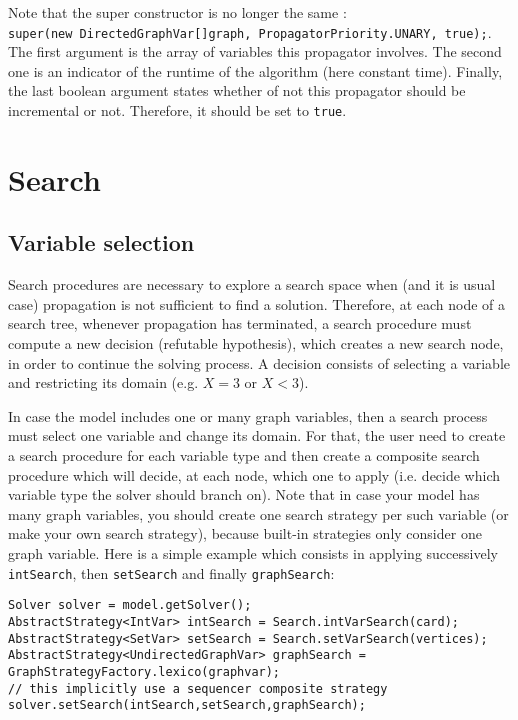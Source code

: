\documentclass{article}
\begin{document}
Note that the super constructor is no longer the same : \\
\texttt{super(new DirectedGraphVar[]{graph}, PropagatorPriority.UNARY, true);}. 
The first argument is the array of variables this propagator involves. The second one is an indicator of the runtime of the algorithm (here constant time). Finally, the last boolean argument states whether of not this propagator should be incremental or not. Therefore, it should be set to \texttt{true}.

\newpage{}
\section{Search}

\subsection{Variable selection}

Search procedures are necessary to explore a search space when (and it is usual case) propagation is not sufficient to find a solution. 
Therefore, at each node of a search tree, whenever propagation has terminated, a search procedure must compute a new decision (refutable hypothesis), which creates a new search node, in order to continue the solving process. A decision consists of selecting a variable and restricting its domain (e.g. $X=3$ or $X<3$). 

In case the model includes one or many graph variables, then a search process must select one variable and change its domain. 
For that, the user need to create a search procedure for each variable type and then create a composite search procedure which will decide, at each node, which one to apply (i.e. decide which variable type the solver should branch on). Note that in case your model has many graph variables, you should create one search strategy per such variable (or make your own search strategy), because built-in strategies only consider one graph variable. Here is a simple example which consists in applying successively \texttt{intSearch}, then \texttt{setSearch} and finally \texttt{graphSearch}:

\begin{lstlisting}
Solver solver = model.getSolver();
AbstractStrategy<IntVar> intSearch = Search.intVarSearch(card);
AbstractStrategy<SetVar> setSearch = Search.setVarSearch(vertices);
AbstractStrategy<UndirectedGraphVar> graphSearch = GraphStrategyFactory.lexico(graphvar);
// this implicitly use a sequencer composite strategy
solver.setSearch(intSearch,setSearch,graphSearch); 
\end{lstlisting}
\end{document}
